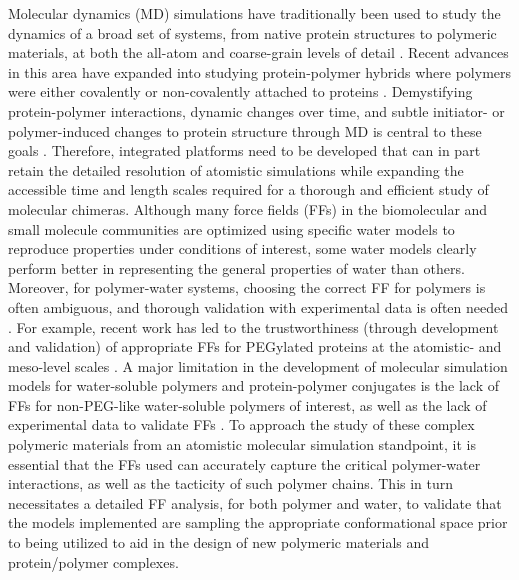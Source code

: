 \documentclass[9pt,tutorial]{livecoms}
\begin{document}
Molecular dynamics (MD) simulations have traditionally been used to study the dynamics of a broad set of systems, from native protein structures to polymeric materials, at both the all-atom and coarse-grain levels of detail \cite{Frenkel_1996, Leach_2001}. Recent advances in this area have expanded into studying protein-polymer hybrids where polymers were either covalently or non-covalently attached to proteins \cite{bioconjug_nextgen}. Demystifying protein-polymer interactions, dynamic changes over time, and subtle initiator- or polymer-induced changes to protein structure through MD is central to these goals \cite{Lin2019, lak_2021}. Therefore, integrated platforms need to be developed that can in part retain the detailed resolution of atomistic simulations while expanding the accessible time and length scales required for a thorough and efficient study of molecular chimeras.
Although many force fields (FFs) in the biomolecular and small molecule communities are optimized using specific water models to reproduce properties under conditions of interest, some water models clearly perform better in representing the general properties of water than others. Moreover, for polymer-water systems, choosing the correct FF for polymers is often ambiguous, and thorough validation with experimental data is often needed \cite{kubota-kubota, kubota-kubota2, tacx2000, bucholz2017, Rukmani2019}.  For example, recent work has led to the trustworthiness (through development and validation) of appropriate FFs for PEGylated proteins at the atomistic- and meso-level scales \cite{aravinda_peg1, farhad_2018}. A major limitation in the development of molecular simulation models for water-soluble polymers and protein-polymer conjugates is the lack of FFs for non-PEG-like water-soluble polymers of interest, as well as the lack of experimental data to validate FFs \cite{Rukmani2019, Lin2019}. To approach the study of these complex polymeric materials from an atomistic molecular simulation standpoint, it is essential that the FFs used can accurately capture the critical polymer-water interactions, as well as the tacticity of such polymer chains.  This in turn necessitates a detailed FF analysis, for both polymer and water, to validate that the models implemented are sampling the appropriate conformational space prior to being utilized to aid in the design of new polymeric materials and protein/polymer complexes. 
\end{document}

